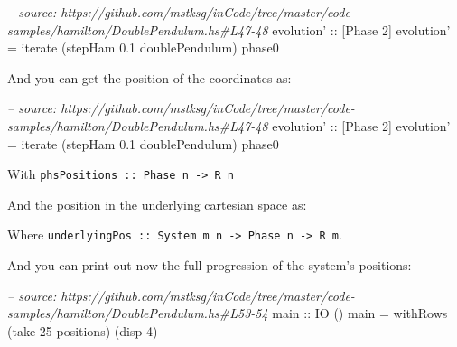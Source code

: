 \documentclass[]{article}
\newenvironment{Shaded}{}{}
\newcommand{\DataTypeTok}[1]{\textcolor[rgb]{0.56,0.13,0.00}{{#1}}}
\newcommand{\DecValTok}[1]{\textcolor[rgb]{0.25,0.63,0.44}{{#1}}}
\newcommand{\FloatTok}[1]{\textcolor[rgb]{0.25,0.63,0.44}{{#1}}}
\newcommand{\CommentTok}[1]{\textcolor[rgb]{0.38,0.63,0.69}{\textit{{#1}}}}
\newcommand{\OtherTok}[1]{\textcolor[rgb]{0.00,0.44,0.13}{{#1}}}
\newcommand{\FunctionTok}[1]{\textcolor[rgb]{0.02,0.16,0.49}{{#1}}}
\newcommand{\NormalTok}[1]{{#1}}
\begin{document}
\begin{Shaded}
\begin{Highlighting}[]
\CommentTok{-- source: https://github.com/mstksg/inCode/tree/master/code-samples/hamilton/DoublePendulum.hs#L47-48}
\OtherTok{evolution' ::} \NormalTok{[}\DataTypeTok{Phase} \DecValTok{2}\NormalTok{]}
\NormalTok{evolution' }\FunctionTok{=} \NormalTok{iterate (stepHam }\FloatTok{0.1} \NormalTok{doublePendulum) phase0}
\end{Highlighting}
\end{Shaded}

And you can get the position of the coordinates as:

\begin{Shaded}
\begin{Highlighting}[]
\CommentTok{-- source: https://github.com/mstksg/inCode/tree/master/code-samples/hamilton/DoublePendulum.hs#L47-48}
\OtherTok{evolution' ::} \NormalTok{[}\DataTypeTok{Phase} \DecValTok{2}\NormalTok{]}
\NormalTok{evolution' }\FunctionTok{=} \NormalTok{iterate (stepHam }\FloatTok{0.1} \NormalTok{doublePendulum) phase0}
\end{Highlighting}
\end{Shaded}

With \texttt{phsPositions\ ::\ Phase\ n\ -\textgreater{}\ R\ n}

And the position in the underlying cartesian space as:

\begin{Shaded}
\end{Shaded}

Where
\texttt{underlyingPos\ ::\ System\ m\ n\ -\textgreater{}\ Phase\ n\ -\textgreater{}\ R\ m}.

And you can print out now the full progression of the system's positions:

\begin{Shaded}
\begin{Highlighting}[]
\CommentTok{-- source: https://github.com/mstksg/inCode/tree/master/code-samples/hamilton/DoublePendulum.hs#L53-54}
\OtherTok{main ::} \DataTypeTok{IO} \NormalTok{()}
\NormalTok{main }\FunctionTok{=} \NormalTok{withRows (take }\DecValTok{25} \NormalTok{positions) (disp }\DecValTok{4}\NormalTok{)}
\end{Highlighting}
\end{Shaded}
\end{document}
